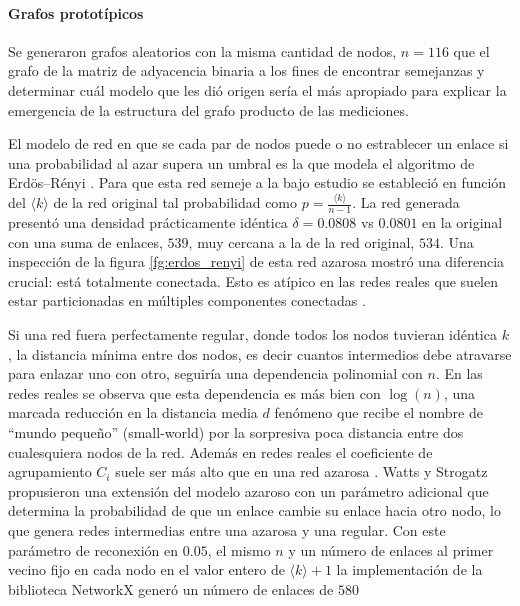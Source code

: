 \documentclass{article}
\begin{document}
\paragraph{Grafos prototípicos}
Se generaron grafos aleatorios con la misma cantidad de nodos, $n = 116$ que el grafo de la matriz de adyacencia binaria a los fines de encontrar semejanzas y determinar cuál modelo que les dió origen sería el más apropiado para explicar la emergencia de la estructura del grafo producto de las mediciones.

El modelo de red en que se cada par de nodos puede o no estrablecer un enlace si una probabilidad al azar supera un umbral es la que modela el algoritmo de Erdös–Rényi \cite[sección 3.2]{albert-laszlo_barabasi_network_2016}.
Para que esta red semeje a la bajo estudio se estableció en función del $\langle k \rangle$ de la red original tal probabilidad como $p = \frac{\langle k \rangle}{n -1}$.
La red generada presentó una densidad prácticamente idéntica $\delta = 0.0808$ vs $0.0801$ en la original con una suma de enlaces, $539$, muy cercana a la de la red original, $534$.
Una inspección de la figura \ref{fg:erdos_renyi} de esta red azarosa mostró una diferencia crucial: está totalmente conectada.
Esto es atípico en las redes reales que suelen estar particionadas en múltiples componentes conectadas \cite[sección 3.7]{albert-laszlo_barabasi_network_2016}.

Si una red fuera perfectamente regular, donde todos los nodos tuvieran idéntica $k$, la distancia mínima entre dos nodos, es decir cuantos intermedios debe atravarse para enlazar uno con otro, seguiría una dependencia polinomial con $n$.
En las redes reales se observa que esta dependencia es más bien con $\log(n)$, una marcada reducción en la distancia media $d$ fenómeno que recibe el nombre de ``mundo pequeño'' (small-world) por la sorpresiva poca distancia entre dos cualesquiera nodos de la red.
Además en redes reales el coeficiente de agrupamiento $C_i$ suele ser más alto que en una red azarosa \cite[sección 3.9]{albert-laszlo_barabasi_network_2016}. 
Watts y Strogatz propusieron una extensión del modelo azaroso con un parámetro adicional que determina la probabilidad de que un enlace cambie su enlace hacia otro nodo, lo que genera redes intermedias entre una azarosa y una regular.
Con este parámetro de reconexión en $0.05$, el mismo $n$ y un número de enlaces al primer vecino fijo en cada nodo en el valor entero de $\langle k \rangle + 1$ la implementación de la biblioteca NetworkX generó un número de enlaces de $580$
\end{document}
